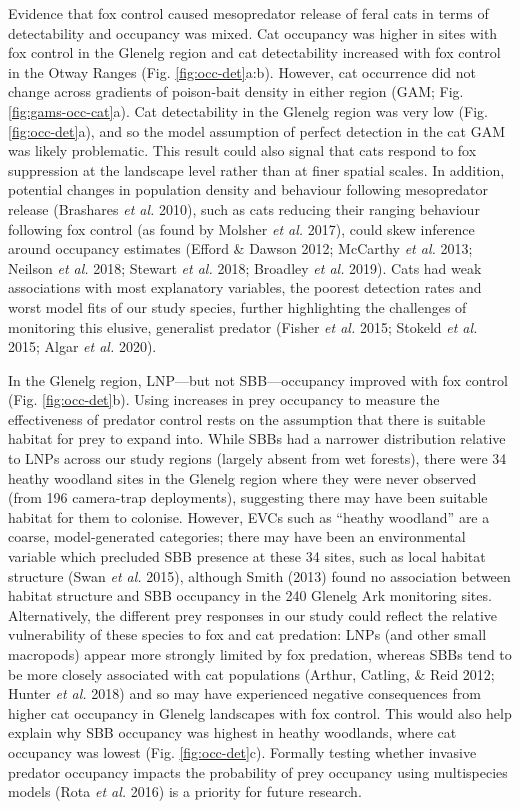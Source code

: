 \documentclass[11pt,a4paper,titlepage,twoside,openright]{style/unimelbthesis}
\begin{document}
\begin{mainmatter}
Evidence that fox control caused mesopredator release of feral cats in terms of detectability and occupancy was mixed. Cat occupancy was higher in sites with fox control in the Glenelg region and cat detectability increased with fox control in the Otway Ranges (Fig. \ref{fig:occ-det}a:b). However, cat occurrence did not change across gradients of poison-bait density in either region (GAM; Fig. \ref{fig:gams-occ-cat}a). Cat detectability in the Glenelg region was very low (Fig. \ref{fig:occ-det}a), and so the model assumption of perfect detection in the cat GAM was likely problematic. This result could also signal that cats respond to fox suppression at the landscape level rather than at finer spatial scales. In addition, potential changes in population density and behaviour following mesopredator release (Brashares \emph{et al.} 2010), such as cats reducing their ranging behaviour following fox control (as found by Molsher \emph{et al.} 2017), could skew inference around occupancy estimates (Efford \& Dawson 2012; McCarthy \emph{et al.} 2013; Neilson \emph{et al.} 2018; Stewart \emph{et al.} 2018; Broadley \emph{et al.} 2019). Cats had weak associations with most explanatory variables, the poorest detection rates and worst model fits of our study species, further highlighting the challenges of monitoring this elusive, generalist predator (Fisher \emph{et al.} 2015; Stokeld \emph{et al.} 2015; Algar \emph{et al.} 2020).

In the Glenelg region, LNP---but not SBB---occupancy improved with fox control (Fig. \ref{fig:occ-det}b). Using increases in prey occupancy to measure the effectiveness of predator control rests on the assumption that there is suitable habitat for prey to expand into. While SBBs had a narrower distribution relative to LNPs across our study regions (largely absent from wet forests), there were 34 heathy woodland sites in the Glenelg region where they were never observed (from 196 camera-trap deployments), suggesting there may have been suitable habitat for them to colonise. However, EVCs such as ``heathy woodland'' are a coarse, model-generated categories; there may have been an environmental variable which precluded SBB presence at these 34 sites, such as local habitat structure (Swan \emph{et al.} 2015), although Smith (2013) found no association between habitat structure and SBB occupancy in the 240 Glenelg Ark monitoring sites. Alternatively, the different prey responses in our study could reflect the relative vulnerability of these species to fox and cat predation: LNPs (and other small macropods) appear more strongly limited by fox predation, whereas SBBs tend to be more closely associated with cat populations (Arthur, Catling, \& Reid 2012; Hunter \emph{et al.} 2018) and so may have experienced negative consequences from higher cat occupancy in Glenelg landscapes with fox control. This would also help explain why SBB occupancy was highest in heathy woodlands, where cat occupancy was lowest (Fig. \ref{fig:occ-det}c). Formally testing whether invasive predator occupancy impacts the probability of prey occupancy using multispecies models (Rota \emph{et al.} 2016) is a priority for future research.


\end{mainmatter}
\end{document}
